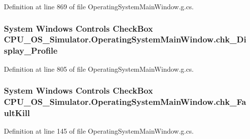 Definition at line 869 of file Operating\+System\+Main\+Window.\+g.\+cs.

\hypertarget{class_c_p_u___o_s___simulator_1_1_operating_system_main_window_aa13338d96952aafec3ecbc7f4fa6fcfc}{}
\subsubsection[{chk\+\_\+\+Display\+\_\+\+Profile}]{\setlength{\rightskip}{0pt plus 5cm}System Windows Controls Check\+Box C\+P\+U\+\_\+\+O\+S\+\_\+\+Simulator.\+Operating\+System\+Main\+Window.\+chk\+\_\+\+Display\+\_\+\+Profile\hspace{0.3cm}{\ttfamily [package]}}\label{class_c_p_u___o_s___simulator_1_1_operating_system_main_window_aa13338d96952aafec3ecbc7f4fa6fcfc}


Definition at line 805 of file Operating\+System\+Main\+Window.\+g.\+cs.

\hypertarget{class_c_p_u___o_s___simulator_1_1_operating_system_main_window_ad8b3845bf83d04c87c660d142f021e83}{}
\subsubsection[{chk\+\_\+\+Fault\+Kill}]{\setlength{\rightskip}{0pt plus 5cm}System Windows Controls Check\+Box C\+P\+U\+\_\+\+O\+S\+\_\+\+Simulator.\+Operating\+System\+Main\+Window.\+chk\+\_\+\+Fault\+Kill\hspace{0.3cm}{\ttfamily [package]}}\label{class_c_p_u___o_s___simulator_1_1_operating_system_main_window_ad8b3845bf83d04c87c660d142f021e83}


Definition at line 145 of file Operating\+System\+Main\+Window.\+g.\+cs.

